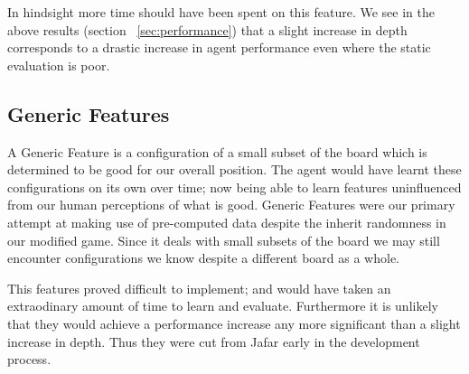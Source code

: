 \documentclass[11pt]{article}
\begin{document}
In hindsight more time should have been spent on this feature. We see in the above results
(section ~\ref{sec:performance}) that a slight increase in depth corresponds to
a drastic increase in agent performance even where the static evaluation is poor.

\subsection{Generic Features}
\label{sub:generic_features}

A Generic Feature is a configuration of a small subset of the board which is
determined to be good for our overall position. The agent would have learnt these configurations
on its own over time; now being able to learn features uninfluenced from our human
perceptions of what is good.
Generic Features were our primary attempt at making use of pre-computed data despite
the inherit randomness in our modified game. Since it deals with small subsets of the
board we may still encounter configurations we know despite a different board as a whole.

This features proved difficult to implement; and would have taken an
extraodinary amount of time to learn and evaluate. Furthermore it is unlikely
that they would achieve a performance increase any more significant than a slight increase
in depth. Thus they were cut from Jafar
early in the development process.




\end{document}
